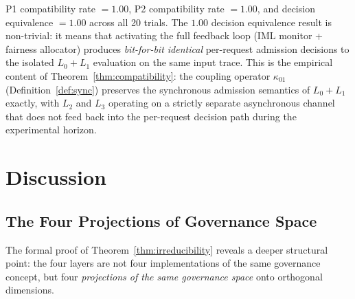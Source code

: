 \documentclass[11pt]{article}
\newcommand{\Layer}[1]{L_{#1}}
\begin{document}
P1 compatibility rate $= 1.00$, P2 compatibility rate $= 1.00$, and
decision equivalence $= 1.00$ across all 20 trials.  The $1.00$ decision
equivalence result is non-trivial: it means that activating the full
feedback loop (IML monitor + fairness allocator) produces \emph{bit-for-bit
identical} per-request admission decisions to the isolated $\Layer{0}+\Layer{1}$
evaluation on the same input trace.  This is the empirical content of
Theorem~\ref{thm:compatibility}: the coupling operator $\kappa_{01}$
(Definition~\ref{def:sync}) preserves the synchronous admission semantics
of $\Layer{0}+\Layer{1}$ exactly, with $\Layer{2}$ and $\Layer{3}$
operating on a strictly separate asynchronous channel that does not feed
back into the per-request decision path during the experimental horizon.

\section{Discussion}
\label{sec:discussion}

\subsection{The Four Projections of Governance Space}

The formal proof of Theorem~\ref{thm:irreducibility} reveals a deeper
structural point: the four layers are not four implementations of the same
governance concept, but four \emph{projections of the same governance space}
onto orthogonal dimensions.
\end{document}
